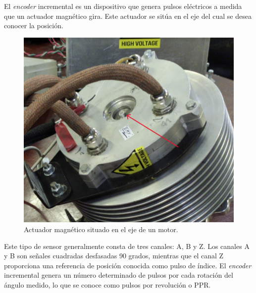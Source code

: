 El \textit{encoder} incremental es un dispositivo que genera pulsos eléctricos a medida que un actuador magnético gira. Este actuador se sitúa en el eje del cual se desea conocer la posición.

\begin{figure}[H]
	\centering
	\includegraphics[width=0.6\linewidth]{fig/encoder1}
	\caption{Actuador magnético situado en el eje de un motor.}
\end{figure}

Este tipo de sensor generalmente consta de tres canales: A, B y Z. Los canales A y B son señales cuadradas desfasadas 90 grados, mientras que el canal Z proporciona una referencia de posición conocida como pulso de índice. El \textit{encoder} incremental genera un número determinado de pulsos por cada rotación del ángulo medido, lo que se conoce como pulsos por revolución o PPR.

